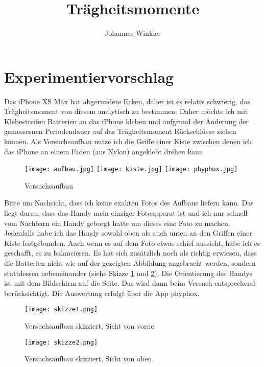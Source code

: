 \documentclass{article}
\title{Trägheitsmomente}
\author{Johannes Winkler}
\date{}
\begin{document}
 
 
 
\pagestyle{fancy}


\tableofcontents

\newpage


\setcounter{section}{-1}

\section{Experimentiervorschlag}

Das iPhone XS Max hat abgerundete Ecken, daher ist es relativ schwierig, das Trägheitsmoment von diesem analytisch zu bestimmen. Daher möchte ich mit Klebestreifen Batterien an das iPhone kleben und aufgrund der Änderung der gemessesnen Periodendauer auf das Trägheitsmoment Rückschlüsse ziehen können. Als Versuchsaufbau nutze ich die Griffe einer Kiste zwischen denen ich das iPhone an einem Faden (aus Nylon) angeklebt drehen kann.
\begin{figure}[H]
\texttt{[image: aufbau.jpg]}
\texttt{[image: kiste.jpg]}
\texttt{[image: phyphox.jpg]}
\caption{Versuchsaufbau}
\end{figure}

Bitte um Nachsicht, dass ich keine exakten Fotos des Aufbaus liefern kann. Das liegt daran, dass das Handy mein einziger Fotoapparat ist und ich nur schnell vom Nachbarn ein Handy geborgt hatte um dieses eine Foto zu machen. Jedenfalls habe ich das Handy sowohl oben als auch unten an den Griffen einer Kiste festgebunden. Auch wenn es auf dem Foto etwas schief aussieht, habe ich es geschafft, es zu balancieren. Es hat sich zusätzlich noch als richtig erwiesen, dass die Batterien nicht wie auf der gezeigten Abbildung angebracht werden, sondern stattdessen nebeneinander (siehe Skizze \ref{fig:skizze1} und \ref{fig:skizze2}). Die Orientierung des Handys ist mit dem Bildschirm auf die Seite. Das wird dann beim Versuch entsprechend berücksichtigt. Die Auswertung erfolgt über die App phyphox.


\begin{figure}[H]
\texttt{[image: skizze1.png]}
\caption{Versuchsaufbau skizziert, Sicht von vorne.}
\label{fig:skizze1}
\end{figure}

\begin{figure}[H]
\texttt{[image: skizze2.png]}
\caption{Versuchsaufbau skizziert, Sicht von oben.}
\label{fig:skizze2}
\end{figure}
\end{document}
